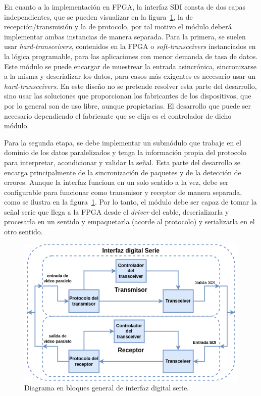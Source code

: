   En cuanto a la implementación en FPGA, la interfaz SDI consta de dos capas
  independientes, que se pueden visualizar en la figura~\ref{fig:sdi1}, la de
  recepción/transmisión y la de protocolo, por tal motivo el módulo deberá
  implementar ambas instancias de manera separada. Para la primera, se suelen
  usar \textit{hard-transceivers}, contenidos en la FPGA o \textit{soft-transceivers}
  instanciados en la lógica programable, para las aplicaciones con menor demanda
  de tasa de datos. Este módulo se puede encargar de muestrear la entrada
  asincrónica, sincronizarse a la misma y deserializar los datos, para casos más
  exigentes es necesario usar un \textit{hard-transceivers}. En este diseño no se
  pretende resolver esta parte del desarrollo, sino usar las soluciones que
  proporcionan los fabricantes de los dispositivos, que por lo general son de uso
  libre, aunque propietarias. El desarrollo que puede ser necesario dependiendo
  el fabricante que se elija es el controlador de dicho módulo.

  Para la segunda etapa, se debe implementar un submódulo que trabaje en el dominio
  de los datos paralelizados y tenga la información propia del protocolo para
  interpretar, acondicionar y validar la señal. Esta parte del desarrollo se
  encarga principalmente de la sincronización de paquetes y de la detección de
  errores. Aunque la interfaz funciona en un solo sentido a la vez, debe ser
  configurable para funcionar como transmisor y receptor de manera separada, como
  se ilustra en la figura~\ref{fig:sdi1}. Por lo tanto, el módulo debe ser capaz
  de tomar la señal serie que llega a la FPGA desde el \textit{driver} del cable,
  deserializarla y procesarla en un sentido y empaquetarla (acorde al
  protocolo) y serializarla en el otro sentido.

  \begin{figure}[htbp]
      \centering
      \includegraphics[width=\linewidth]{./Figures/sdi.png}
      \caption{Diagrama en bloques general de interfaz digital serie.}\label{fig:sdi1}
  \end{figure}

